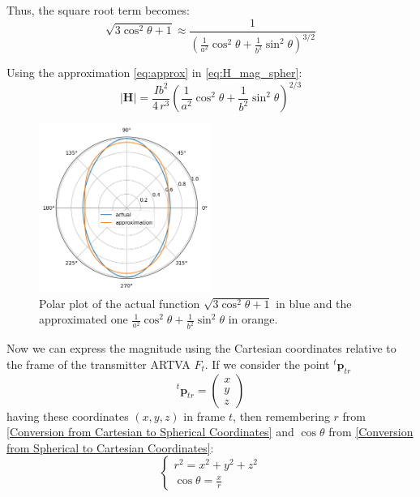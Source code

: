 
Thus, the square root term becomes:
\begin{equation}
    \sqrt{ 3 \cos^2 \theta + 1} \approx \frac{1}{\left(\frac{1}{a^2} \cos^2 \theta + \frac{1}{b^2} \sin^2 \theta\right)^{3/2}}
    \label{eq:approx}
\end{equation}

Using the approximation \eqref{eq:approx} in \eqref{eq:H_mag_spher}:
\begin{equation}
    \left| \mathbf{H} \right| = \frac{I b^2}{4 \, r^3} \left(\frac{1}{a^2} \cos^2 \theta + \frac{1}{b^2} \sin^2 \theta\right)^{2/3}
    \label{eq:H_mag_approx}
\end{equation}

\begin{figure}[h!]
\centering
\includegraphics[width=0.5\textwidth]{images/polar_plot.png}
\caption{Polar plot of the actual function $\sqrt{ 3 \cos^2 \theta + 1} $ in blue 
and the approximated one $\frac{1}{a^2 }\cos^2 \theta + \frac{1}{b^2} \sin^2 \theta$ in orange.}
\label{fig:polarplot}
\end{figure}

Now we can express the magnitude using the Cartesian coordinates relative to the frame of the transmitter ARTVA $F_t$. 
If we consider the point ${}^t \mathbf{p}_{tr}$\[
    {}^t \mathbf{p}_{tr} = \begin{pmatrix}
    x \\
    y \\
    z
\end{pmatrix}
\] having these coordinates $(x,y,z)$ in frame $t$, then remembering $r$ from \ref{Conversion from Cartesian to Spherical Coordinates} and $\cos\theta$ from \ref{Conversion from Spherical to Cartesian Coordinates}:
\[
\begin{cases}
r^2 = x^2 + y^2 + z^2 \\
\cos\theta = \frac{x}{r}
\end{cases}
\]

